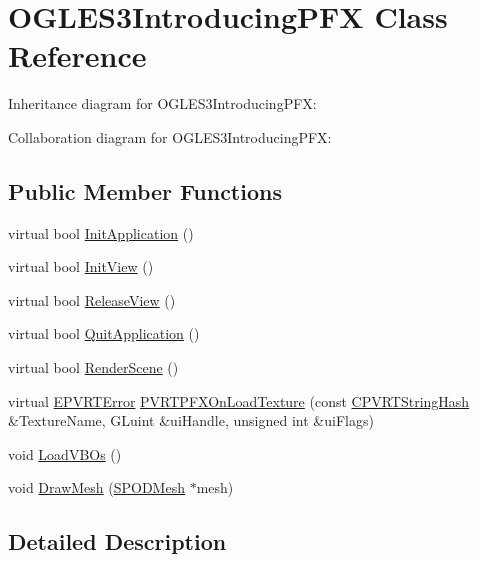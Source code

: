 \hypertarget{class_o_g_l_e_s3_introducing_p_f_x}{\section{O\+G\+L\+E\+S3\+Introducing\+P\+F\+X Class Reference}
\label{class_o_g_l_e_s3_introducing_p_f_x}
}


Inheritance diagram for O\+G\+L\+E\+S3\+Introducing\+P\+F\+X\+:


Collaboration diagram for O\+G\+L\+E\+S3\+Introducing\+P\+F\+X\+:
\subsection*{Public Member Functions}
\begin{DoxyCompactItemize}
\item 
virtual bool \hyperlink{class_o_g_l_e_s3_introducing_p_f_x_af54c0450f0c2d58122b50a2c3d893d07}{Init\+Application} ()
\item 
virtual bool \hyperlink{class_o_g_l_e_s3_introducing_p_f_x_a6762e7f140fe15a0a945e39abf25ae34}{Init\+View} ()
\item 
virtual bool \hyperlink{class_o_g_l_e_s3_introducing_p_f_x_ac2f3d629ec9f26bb20f6183141a12933}{Release\+View} ()
\item 
virtual bool \hyperlink{class_o_g_l_e_s3_introducing_p_f_x_afba6db34e67d136e6fb14e578069a022}{Quit\+Application} ()
\item 
virtual bool \hyperlink{class_o_g_l_e_s3_introducing_p_f_x_abbd51fa216b5d827fb5b5e5b0798c0b1}{Render\+Scene} ()
\item 
virtual \hyperlink{_p_v_r_t_error_8h_a9e837ff1a83f3a5f332bc4cc78454608}{E\+P\+V\+R\+T\+Error} \hyperlink{class_o_g_l_e_s3_introducing_p_f_x_aa25586d3be98ab288273c94cce4985f9}{P\+V\+R\+T\+P\+F\+X\+On\+Load\+Texture} (const \hyperlink{class_c_p_v_r_t_string_hash}{C\+P\+V\+R\+T\+String\+Hash} \&Texture\+Name, G\+Luint \&ui\+Handle, unsigned int \&ui\+Flags)
\item 
void \hyperlink{class_o_g_l_e_s3_introducing_p_f_x_a3afaf28efe6f937d205772084b59ecb5}{Load\+V\+B\+Os} ()
\item 
void \hyperlink{class_o_g_l_e_s3_introducing_p_f_x_a221470b31c268b2649ed3a019b3c57eb}{Draw\+Mesh} (\hyperlink{struct_s_p_o_d_mesh}{S\+P\+O\+D\+Mesh} $\ast$mesh)
\end{DoxyCompactItemize}


\subsection{Detailed Description}


